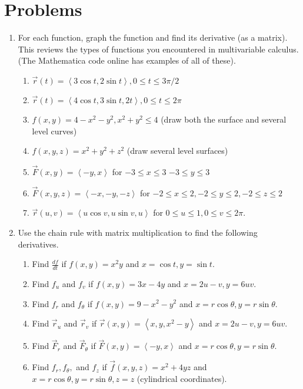 \section{Problems}
\begin{enumerate}
	\item For each function, graph the function and find its derivative (as a matrix). This reviews the types of functions you encountered in multivariable calculus. (The Mathematica code online has examples of all of these).
\begin{enumerate}
	\item $\vec r(t)=\left<3\cos t, 2 \sin t\right>, 0\leq t\leq 3\pi/2$
	\item $\vec r(t)=\left<4\cos t, 3\sin t,2t\right>, 0\leq t\leq 2\pi$
	\item $f(x,y)=4-x^2-y^2, x^2+y^2\leq 4$ (draw both the surface and several level curves)
	\item $f(x,y,z)=x^2+y^2+z^2$ (draw several level surfaces)
	\item $\vec F(x,y)=\left<-y, x\right>$ for $-3\leq x\leq 3$ $-3\leq y\leq 3$
	\item $\vec F(x,y,z)=\left<-x, -y,-z\right>$ for $-2\leq x\leq 2,-2\leq y\leq 2,-2\leq z\leq 2$
	\item $\vec r(u,v)=\left<u\cos v, u\sin v, u \right>$ for $0\leq u\leq 1, 0\leq v\leq 2\pi$.
\end{enumerate}

	\item Use the chain rule with matrix multiplication to find the following derivatives.
\begin{enumerate}
	\item Find $\frac{df}{dt}$ if $f(x,y)=x^2y$ and $x=\cos t, y=\sin t$.
	\item Find $f_u$ and $f_v$ if $f(x,y)=3x-4y$ and $x=2u-v, y=6uv$.
	\item Find $f_r$ and $f_\theta$ if $f(x,y)=9-x^2-y^2$ and $x=r\cos \theta, y=r\sin\theta$.
	\item Find $\vec r_u$ and $\vec r_v$ if $\vec r(x,y)=\left<x,y,x^2-y\right>$ and $x=2u-v, y=6uv$.
	\item Find $\vec F_r$ and $\vec F_\theta$ if $\vec F(x,y)=\left<-y,x\right>$ and $x=r\cos\theta, y=r\sin\theta$.
	\item Find $f_r, f_\theta,$ and $f_z$ if $\vec f(x,y,z)=x^2+4yz$ and $x=r\cos\theta, y=r\sin\theta, z=z$ (cylindrical coordinates).
\end{enumerate}


\end{enumerate}
